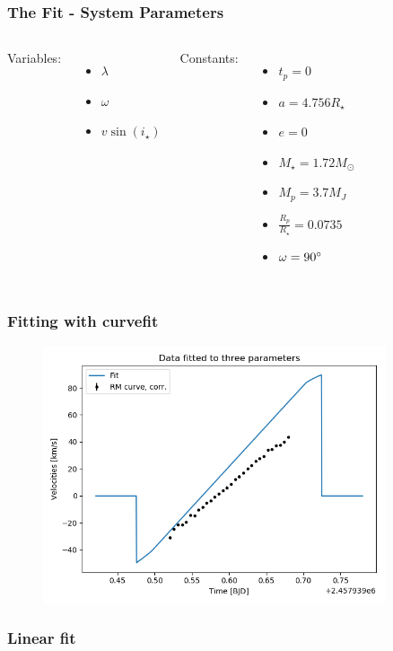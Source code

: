 \documentclass[show notes]{beamer}
\begin{document}
\begin{frame}
\frametitle{The Fit - System Parameters}
\begin{columns}
	Variables:
	\begin{itemize}
	\item $\lambda$
	\item $\omega$
	\item $v \sin(i_\star)$
	\end{itemize}
	Constants:
	\begin{itemize}
	\item $t_p = 0$
	\item $a = 4.756 R_\star$
	\item $e = 0$
	\item $M_\star = 1.72 M_\odot$
	\item $M_p = 3.7 M_J$
	\item $\frac{R_p}{R_\star} = 0.0735$
	\item $\omega = 90 \degree$
	\end{itemize}
\end{columns}
\end{frame}

\begin{frame}
\frametitle{Fitting with curvefit}
\begin{figure}
\centering
\includegraphics[width=0.9\textwidth]{../figures/curve_fit_rmcurve.png}
\end{figure}
\end{frame}

\begin{frame}
\frametitle{Linear fit}
\end{frame}
\end{document}

